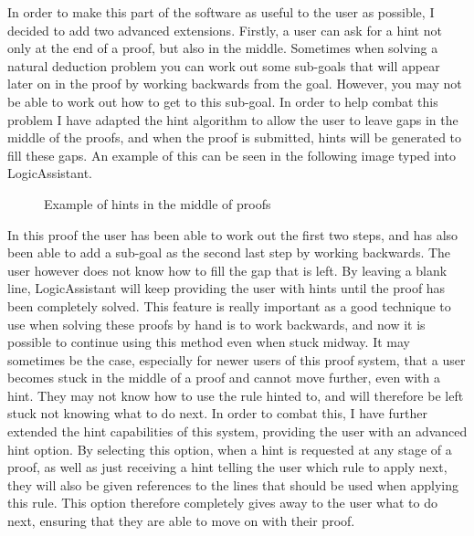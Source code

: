 In order to make this part of the software as useful to the user as possible, I decided to add two advanced extensions. Firstly, a user can ask for a hint not only at the end of a proof, but also in the middle. Sometimes when solving a natural deduction problem you can work out some sub-goals that will appear later on in the proof by working backwards from the goal. However, you may not be able to work out how to get to this sub-goal. In order to help combat this problem I have adapted the hint algorithm to allow the user to leave gaps in the middle of the proofs, and when the proof is submitted, hints will be generated to fill these gaps. An example of this can be seen in the following image typed into LogicAssistant.

\begin{figure}[!ht]
	\centering
	\caption{Example of hints in the middle of proofs}
\end{figure}

In this proof the user has been able to work out the first two steps, and has also been able to add a sub-goal as the second last step by working backwards. The user however does not know how to fill the gap that is left. By leaving a blank line, LogicAssistant will keep providing the user with hints until the proof has been completely solved. This feature is really important as a good technique to use when solving these proofs by hand is to work backwards, and now it is possible to continue using this method even when stuck midway. It may sometimes be the case, especially for newer users of this proof system, that a user becomes stuck in the middle of a proof and cannot move further, even with a hint. They may not know how to use the rule hinted to, and will therefore be left stuck not knowing what to do next. In order to combat this, I have further extended the hint capabilities of this system, providing the user with an advanced hint option. By selecting this option, when a hint is requested at any stage of a proof, as well as just receiving a hint telling the user which rule to apply next, they will also be given references to the lines that should be used when applying this rule. This option therefore completely gives away to the user what to do next, ensuring that they are able to move on with their proof.

